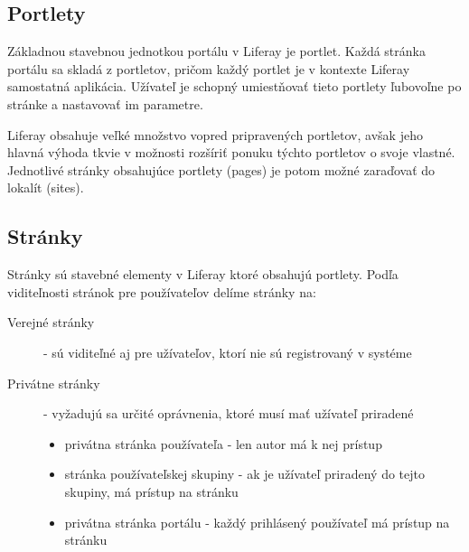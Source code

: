 \documentclass[
  digital, %
  twoside, %
  notable,   %
  nolof,   %
  nolot,   %
]{fithesis3}
\begin{document}
\subsection{Portlety}
\label{portlets}
Základnou stavebnou jednotkou portálu v Liferay je portlet. Každá stránka portálu sa skladá z portletov, pričom každý portlet je v kontexte Liferay samostatná aplikácia. Užívateľ je schopný umiestňovať tieto portlety ľubovoľne po stránke a nastavovať im parametre.

Liferay obsahuje veľké množstvo vopred pripravených portletov, avšak jeho hlavná výhoda tkvie v možnosti rozšíriť ponuku týchto portletov o svoje vlastné. Jednotlivé stránky obsahujúce portlety (pages) je potom možné zaraďovať do lokalít (sites).

\subsection{Stránky}
Stránky sú stavebné elementy v Liferay ktoré obsahujú portlety. Podľa viditeľnosti stránok pre používateľov delíme stránky na:
\begin{description}
\item[Verejné stránky] - sú viditeľné aj pre užívateľov, ktorí nie sú registrovaný v systéme
\item[Privátne stránky] - vyžadujú sa určité oprávnenia, ktoré musí mať užívateľ priradené
\begin{itemize}
\item privátna stránka používateľa - len autor má k nej prístup
\item stránka používateľskej skupiny - ak je užívateľ priradený do tejto skupiny, má prístup na stránku
\item privátna stránka portálu - každý prihlásený používateľ má prístup na stránku
\end{itemize}
\end{description}
\end{document}
